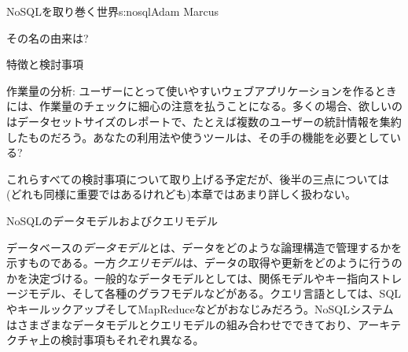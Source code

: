\begin{aosachapter}{NoSQLを取り巻く世界}{s:nosql}{Adam Marcus}
\begin{aosasect1}{その名の由来は?}
\begin{aosasect2}{特徴と検討事項}
\begin{aosadescription}
  \item{作業量の分析}: ユーザーにとって使いやすいウェブアプリケーションを作るときには、作業量のチェックに細心の注意を払うことになる。多くの場合、欲しいのはデータセットサイズのレポートで、たとえば複数のユーザーの統計情報を集約したものだろう。あなたの利用法や使うツールは、その手の機能を必要としている?

\end{aosadescription}

これらすべての検討事項について取り上げる予定だが、後半の三点については(どれも同様に重要ではあるけれども)本章ではあまり詳しく扱わない。

\end{aosasect2}

\end{aosasect1}

\begin{aosasect1}{NoSQLのデータモデルおよびクエリモデル}

データベースの\emph{データモデル}とは、データをどのような論理構造で管理するかを示すものである。一方\emph{クエリモデル}は、データの取得や更新をどのように行うのかを決定づける。一般的なデータモデルとしては、関係モデルやキー指向ストレージモデル、そして各種のグラフモデルなどがある。クエリ言語としては、SQLやキールックアップそしてMapReduceなどがおなじみだろう。NoSQLシステムはさまざまなデータモデルとクエリモデルの組み合わせでできており、アーキテクチャ上の検討事項もそれぞれ異なる。


\end{aosasect1}
\end{aosachapter}
